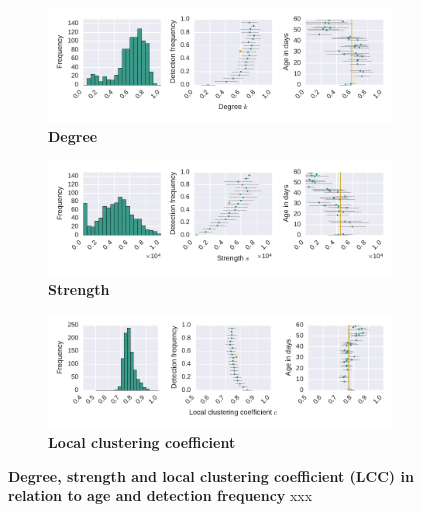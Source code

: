 \begin{figure}[!htb]
	\centering
	\begin{subfigure}[b]{1.0\textwidth}
	\centering
	\includegraphics[width=1.0\textwidth]{Figures/n3-stat-degreeAgeDetF.pdf}
	\caption[Degree]{\textbf{Degree}}
	\label{fig:n3-degree}
	\end{subfigure}
	\begin{subfigure}[b]{1.0\textwidth}
	\centering
	\includegraphics[width=1.0\textwidth]{Figures/n3-stat-strengthAgeDetF.pdf}
	\caption[Strength]{\textbf{Strength}}
	\label{fig:n3-strength}
	\end{subfigure}
	\begin{subfigure}[b]{1.0\textwidth}
	\centering
	\includegraphics[width=1.0\textwidth]{Figures/n3-stat-lccAgeDetF.pdf}
	\caption[Local clustering coefficient]{\textbf{Local clustering coefficient}}
	\label{fig:n3-lcc}
	\end{subfigure}
	\caption[Degree, strength and local clustering coefficient (LCC)]{\textbf{Degree, strength and local clustering coefficient (LCC) in relation to age and detection frequency} xxx}
	\label{fig:n3-degreeStrLCC}
\end{figure}


